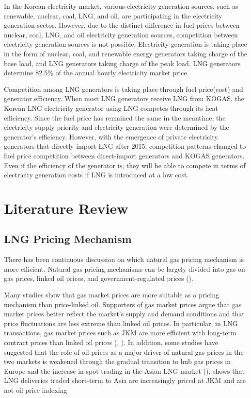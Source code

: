 \documentclass[12pt]{article}
\begin{document}
In the Korean electricity market, various electricity generation sources, such as renewable, nuclear, coal, LNG, and oil, are participating in the electricity generation sector. However, due to the distinct difference in fuel prices between nuclear, coal, LNG, and oil electricity generation sources, competition between electricity generation sources is not possible. Electricity generation is taking place in the form of nuclear, coal, and renewable energy generators taking charge of the base load, and LNG generators taking charge of the peak load. LNG generators determine 82.5\% of the annual hourly electricity market price.

Competition among LNG generators is taking place through fuel price(cost) and generator efficiency. When most LNG generators receive LNG from KOGAS, the Korean LNG electricity generator using LNG competes through its heat efficiency. Since the fuel price has remained the same in the meantime, the electricity supply priority and electricity generation were determined by the generator's efficiency. However, with the emergence of private electricity generators that directly import LNG after 2015, competition patterns changed to fuel price competition between direct-import generators and KOGAS generators. Even if the efficiency of the generator is, they will be able to compete in terms of electricity generation costs if LNG is introduced at a low cost.


\newpage
\section{Literature Review}


\subsection{LNG Pricing Mechanism}
There has been continuous discussion on which natural gas pricing mechanism is more efficient. Natural gas pricing mechanisms can be largely divided into gas-on-gas prices, linked oil prices, and government-regulated prices (\cite{hupka2023review}).

Many studies show that gas market prices are more suitable as a pricing mechanism than price-linked oil. Supporters of gas market prices argue that gas market prices better reflect the market's supply and demand conditions and that price fluctuations are less extreme than linked oil prices. In particular, in LNG transactions, gas market prices such as JKM are more efficient with long-term contract prices than linked oil prices (\cite{zhang2023revisiting}, \cite{alim2018asian}). In addition, some studies have suggested that the role of oil prices as a major driver of natural gas prices in the two markets is weakened through the gradual transition to hub gas prices in Europe and the increase in spot trading in the Asian LNG market (\cite{zhang2018exploring}). \cite{stern2020comparative} shows that LNG deliveries traded short-term to Asia are increasingly priced at JKM and are not oil price indexing
\end{document}
